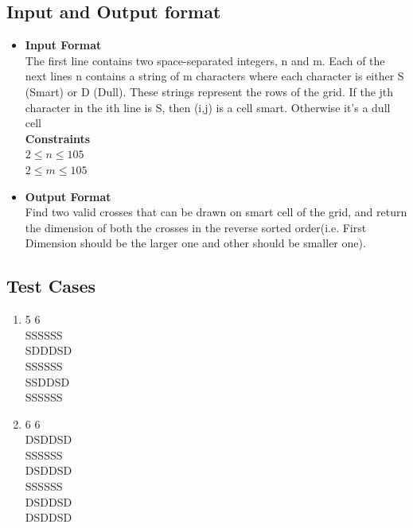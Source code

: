\documentclass[a4paper,12pt]{article}
\begin{document}
	\subsection{Input and Output format}
	\begin{itemize}
		\item \textbf{Input Format}\\
		The first line contains two space-separated integers,  n and m. 
		Each of the next  lines n contains a string of  m characters where each character is either S (Smart) or D (Dull). These strings represent the rows of the grid. If the jth character in the ith  line is S, then  (i,j) is a  cell smart. Otherwise it's a  dull cell \\
		\textbf{Constraints} \\
	$	2 \leqslant n \leqslant 105 $\\
	$	2 \leqslant m \leqslant 105$ \\
		
		\item \textbf{Output Format}\\
		Find two valid crosses that can be drawn on smart cell of the grid, and return the dimension of both the crosses in the reverse sorted order(i.e. First Dimension should be the larger one and other should be smaller one).
		
	\end{itemize}
	\subsection{Test Cases}
	\begin{enumerate}
		\item 
		5 6 \\
		SSSSSS \\
		SDDDSD \\
		SSSSSS \\
		SSDDSD \\
		SSSSSS \\
		
		\item 
		6 6 \\
		DSDDSD\\
		SSSSSS\\
		DSDDSD\\
		SSSSSS\\
		DSDDSD\\
		DSDDSD\\
		
	\end{enumerate}
\end{document}
